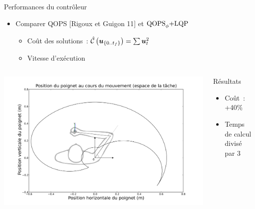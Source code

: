 \begin{frame}{Performances du contrôleur}
    \begin{itemize}
        \item Comparer QOPS $[$Rigoux et Guigon 11$]$ et $\text{QOPS}_\phi\text{+LQP}$
        \begin{itemize}
            \item Coût des solutions~: $\hat{\mathcal{C}}\left(\boldsymbol{u}_{\{0..t_f\}}\right) = \sum \boldsymbol{u}_t^2$
            \item Vitesse d'exécution
        \end{itemize}
    \end{itemize}
    \begin{columns}
        \begin{column}{0.60\textwidth}
            \begin{center}
                \includegraphics[width=.95\linewidth]{fig/cost_2}
            \end{center}
        \end{column}
        \begin{column}{0.40\textwidth}
            \begin{block}{Résultats}
                \begin{itemize}
                    \item Coût~: +40\%
                    \item Temps de calcul divisé par 3
                \end{itemize}
            \end{block}
        \end{column}
    \end{columns}
\end{frame}

